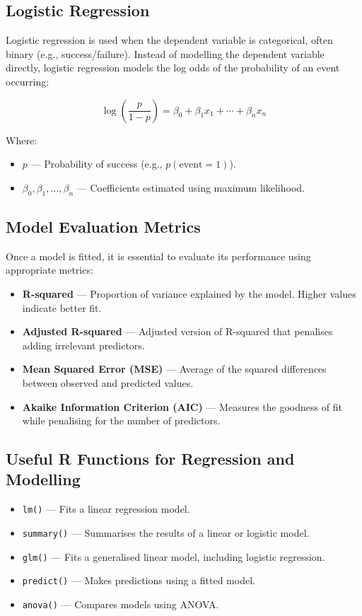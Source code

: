 \subsection{Logistic Regression}
Logistic regression is used when the dependent variable is categorical, often binary (e.g., success/failure). Instead of modelling the dependent variable directly, logistic regression models the log odds of the probability of an event occurring:

\[
\log \left( \frac{p}{1-p} \right) = \beta_0 + \beta_1 x_1 + \cdots + \beta_n x_n
\]

Where:
\begin{itemize}
    \item \(p\) --- Probability of success (e.g., \(p(\text{event} = 1)\)).
    \item \(\beta_0, \beta_1, \ldots, \beta_n\) --- Coefficients estimated using maximum likelihood.
\end{itemize}

\subsection{Model Evaluation Metrics}
Once a model is fitted, it is essential to evaluate its performance using appropriate metrics:

\begin{itemize}
    \item \textbf{R-squared} --- Proportion of variance explained by the model. Higher values indicate better fit.
    \item \textbf{Adjusted R-squared} --- Adjusted version of R-squared that penalises adding irrelevant predictors.
    \item \textbf{Mean Squared Error (MSE)} --- Average of the squared differences between observed and predicted values.
    \item \textbf{Akaike Information Criterion (AIC)} --- Measures the goodness of fit while penalising for the number of predictors.
\end{itemize}

\subsection{Useful R Functions for Regression and Modelling}
\begin{itemize}
    \item \texttt{lm()} --- Fits a linear regression model.
    \item \texttt{summary()} --- Summarises the results of a linear or logistic model.
    \item \texttt{glm()} --- Fits a generalised linear model, including logistic regression.
    \item \texttt{predict()} --- Makes predictions using a fitted model.
    \item \texttt{anova()} --- Compares models using ANOVA.
\end{itemize}

